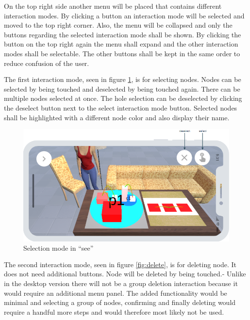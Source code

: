 On the top right side another menu will be placed that contains different interaction modes.
By clicking a button an interaction mode will be selected and moved to the top right corner.
Also, the menu will be collapsed and only the buttons regarding the selected interaction mode shall be shown.
By clicking the button on the top right again the menu shall expand and the other interaction modes shall be selectable.
The other buttons shall be kept in the same order to reduce confusion of the user.

The first interaction mode, seen in figure \ref{fig:select}, is for selecting nodes.
Nodes can be selected by being touched and deselected by being touched again.
There can be multiple nodes selected at once.
The hole selection can be deselected by clicking the deselect button next to the select interaction mode button.
Selected nodes shall be highlighted with a different node color and also display their name.

\begin{figure}[htb]
    \centering
    \includegraphics[width=1\textwidth]{Concept/img/menu1.png}
    \caption{Selection mode in \enquote{\gls{see}}}\label{fig:select}
\end{figure}

The second interaction mode, seen in figure \ref{fig:delete}, is for deleting node.
It does not need additional buttons.
Node will be deleted by being touched.-
Unlike in the desktop version there will not be a group deletion interaction because it would require an additional menu panel.
The added functionality would be minimal and selecting a group of nodes, confirming and finally deleting would require a handful more steps and would therefore most likely not be used.


